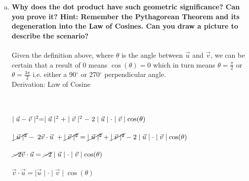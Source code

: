 \documentclass{article}
\begin{document}
\begin{enumerate}[b.]
	\item \textbf{Why does the dot product have such geometric significance? Can you prove it? Hint: Remember the Pythagorean Theorem and its degeneration into the Law of Cosines. Can
	      you draw a picture to describe the scenario? }\\
	\\
	Given the definition above, where $\theta$ is the angle between $\vec{u}$ and $\vec{v}$, we can be certain that a result of $0$ means $\cos(\theta)=0$ which in turn means $\theta=\frac{\pi}{2}$ or $\theta=\frac{3\pi}{2}$ i.e. either a 90$^{\circ}$ or 270$^{\circ}$ perpendicular angle.\\
		
	Derivation: Law of Cosine\\
	\\
	\\
	$\mid\vec{u}-\vec{v}\mid^{2} = \mid\vec{u}\mid^{2} + \mid\vec{v}\mid^{2}-\hspace{.1cm}2\mid\vec{u}\mid\cdot\mid\vec{v}\mid\cos(\theta)$\\
	\\
	$\cancel{\mid\vec{u}\mid^{2}}-\hspace{.1cm}2\vec{v}\cdot\vec{u}\hspace{.1cm}+\cancel{\mid\vec{v}\mid^{2}}=\cancel{\mid\vec{u}\mid^{2}} + \cancel{\mid\vec{v}\mid^{2}}-2\mid\vec{u}\mid\cdot\mid\vec{v}\mid\cos(\theta)$\\
	\\
	$\cancel{-2}\vec{v}\cdot\vec{u} = \cancel{-2}\mid\vec{u}\mid\cdot\mid\vec{v}\mid\cos(\theta)$\\
	\\
	$\vec{v}\cdot\vec{u} = \mid\vec{u}\mid\cdot\mid\vec{v}\mid\cos(\theta)$\\
\end{enumerate}
\end{document}
